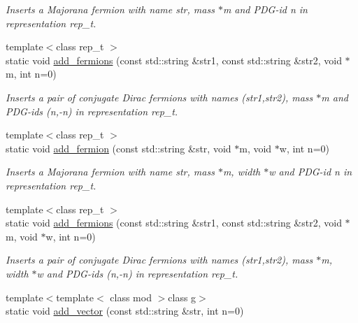 \begin{DoxyCompactItemize}
\begin{DoxyCompactList}\small\item\em Inserts a Majorana fermion with name str, mass $\ast$m and P\+D\+G-\/id n in representation rep\+\_\+t. \end{DoxyCompactList}\item 
\hypertarget{a00372_a067a269d3fd0772630e716939bb85d74}{}{\footnotesize template$<$class rep\+\_\+t $>$ }\\static void \hyperlink{a00372_a067a269d3fd0772630e716939bb85d74}{add\+\_\+fermions} (const std\+::string \&str1, const std\+::string \&str2, void $\ast$m, int n=0)\label{a00372_a067a269d3fd0772630e716939bb85d74}

\begin{DoxyCompactList}\small\item\em Inserts a pair of conjugate Dirac fermions with names (str1,str2), mass $\ast$m and P\+D\+G-\/ids (n,-\/n) in representation rep\+\_\+t. \end{DoxyCompactList}\item 
\hypertarget{a00372_ad7f5ce640caf371a0acafe100f138de4}{}{\footnotesize template$<$class rep\+\_\+t $>$ }\\static void \hyperlink{a00372_ad7f5ce640caf371a0acafe100f138de4}{add\+\_\+fermion} (const std\+::string \&str, void $\ast$m, void $\ast$w, int n=0)\label{a00372_ad7f5ce640caf371a0acafe100f138de4}

\begin{DoxyCompactList}\small\item\em Inserts a Majorana fermion with name str, mass $\ast$m, width $\ast$w and P\+D\+G-\/id n in representation rep\+\_\+t. \end{DoxyCompactList}\item 
\hypertarget{a00372_a91b3e991cb82636afd1e55f43f627cad}{}{\footnotesize template$<$class rep\+\_\+t $>$ }\\static void \hyperlink{a00372_a91b3e991cb82636afd1e55f43f627cad}{add\+\_\+fermions} (const std\+::string \&str1, const std\+::string \&str2, void $\ast$m, void $\ast$w, int n=0)\label{a00372_a91b3e991cb82636afd1e55f43f627cad}

\begin{DoxyCompactList}\small\item\em Inserts a pair of conjugate Dirac fermions with names (str1,str2), mass $\ast$m, width $\ast$w and P\+D\+G-\/ids (n,-\/n) in representation rep\+\_\+t. \end{DoxyCompactList}\item 
\hypertarget{a00372_a0284fb404903e3ebb75dbaa7e337b3ff}{}{\footnotesize template$<$template$<$ class mod $>$class g$>$ }\\static void \hyperlink{a00372_a0284fb404903e3ebb75dbaa7e337b3ff}{add\+\_\+vector} (const std\+::string \&str, int n=0)\label{a00372_a0284fb404903e3ebb75dbaa7e337b3ff}


\end{DoxyCompactItemize}

